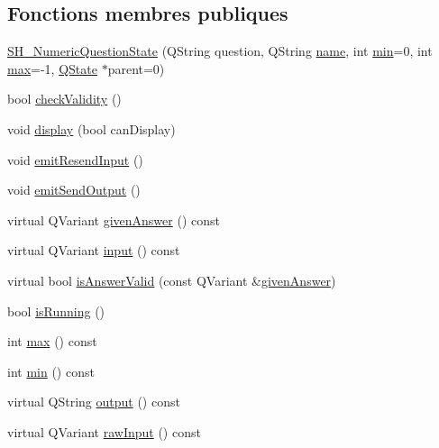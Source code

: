\subsection*{Fonctions membres publiques}
\begin{DoxyCompactItemize}
\item 
\hyperlink{classSH__NumericQuestionState_a848096e00f892bb8c7310943980a6c61}{S\-H\-\_\-\-Numeric\-Question\-State} (Q\-String question, Q\-String \hyperlink{classSH__NamedObject_a9f686c6f2a5bcc08ad03d0cee0151f0f}{name}, int \hyperlink{classSH__NumericQuestionState_a0009413f1bd199864ad0ac5d4d7c4527}{min}=0, int \hyperlink{classSH__NumericQuestionState_ad728f30d51b325d362968e0bbd50e4f2}{max}=-\/1, \hyperlink{classQState}{Q\-State} $\ast$parent=0)
\item 
bool \hyperlink{classSH__QuestionState_a902be003650c33d954d707b2d3ee0bb9}{check\-Validity} ()
\item 
void \hyperlink{classSH__InOutState_a616f88b20478b81b2927a9ddc2b4f521}{display} (bool can\-Display)
\item 
void \hyperlink{classSH__InOutState_ad1695493d39c5194e5b7c6372754ddd7}{emit\-Resend\-Input} ()
\item 
void \hyperlink{classSH__InOutState_a40995f4a8201f21d26b7e78b7e7b652e}{emit\-Send\-Output} ()
\item 
virtual Q\-Variant \hyperlink{classSH__QuestionState_a29cdea8bc55e39e3ed02d24743c30f8c}{given\-Answer} () const 
\item 
virtual Q\-Variant \hyperlink{classSH__InOutState_a8e1b78069343122df7713624a1a5a100}{input} () const 
\item 
virtual bool \hyperlink{classSH__NumericQuestionState_a3676dec63a4da7cecf3fc28d8a197843}{is\-Answer\-Valid} (const Q\-Variant \&\hyperlink{classSH__QuestionState_a29cdea8bc55e39e3ed02d24743c30f8c}{given\-Answer})
\item 
bool \hyperlink{classSH__GenericState_a5f731810dad0cacd28828ccbf1539e4e}{is\-Running} ()
\item 
int \hyperlink{classSH__NumericQuestionState_ad728f30d51b325d362968e0bbd50e4f2}{max} () const 
\item 
int \hyperlink{classSH__NumericQuestionState_a0009413f1bd199864ad0ac5d4d7c4527}{min} () const 
\item 
virtual Q\-String \hyperlink{classSH__InOutState_a17ed7eaf5e3ed5af80a4f9fe65d5bfd9}{output} () const 
\item 
virtual Q\-Variant \hyperlink{classSH__InOutState_a4c674a54f41d2e6ef951b22393dcd89f}{raw\-Input} () const 

\end{DoxyCompactItemize}
